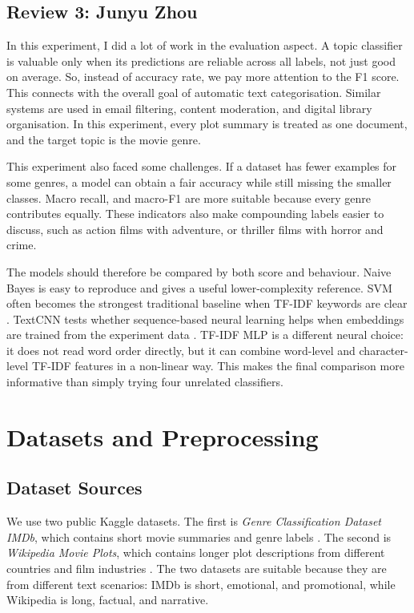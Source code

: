 \documentclass[12pt,a4paper]{article}
\begin{document}
\subsection{Review 3: Junyu Zhou}
In this experiment, I did a lot of work in the evaluation aspect. A topic classifier is valuable only when its predictions are reliable across all labels, not just good on average. So, instead of accuracy rate, we pay more attention to the F1 score. This connects with the overall goal of automatic text categorisation\cite{sebastiani2002}. Similar systems are used in email filtering, content moderation, and digital library organisation. In this experiment, every plot summary is treated as one document, and the target topic is the movie genre.

This experiment also faced some challenges. If a dataset has fewer examples for some genres, a model can obtain a fair accuracy while still missing the smaller classes. Macro recall, and macro-F1 are more suitable because every genre contributes equally. These indicators also make compounding labels easier to discuss, such as action films with adventure, or thriller films with horror and crime.

The models should therefore be compared by both score and behaviour. Naive Bayes is easy to reproduce and gives a useful lower-complexity reference. SVM often becomes the strongest traditional baseline when TF-IDF keywords are clear \cite{cortes1995svm,joachims1998}. TextCNN tests whether sequence-based neural learning helps when embeddings are trained from the experiment data \cite{kim2014cnn}. TF-IDF MLP is a different neural choice: it does not read word order directly, but it can combine word-level and character-level TF-IDF features in a non-linear way. This makes the final comparison more informative than simply trying four unrelated classifiers.

\section{Datasets and Preprocessing}
\subsection{Dataset Sources}
We use two public Kaggle datasets. The first is \textit{Genre Classification Dataset IMDb}, which contains short movie summaries and genre labels \cite{kaggle_imdb_genre}. The second is \textit{Wikipedia Movie Plots}, which contains longer plot descriptions from different countries and film industries \cite{kaggle_wiki_plots}. The two datasets are suitable because they are from different text scenarios: IMDb is short, emotional, and promotional, while Wikipedia is long, factual, and narrative.
\end{document}
